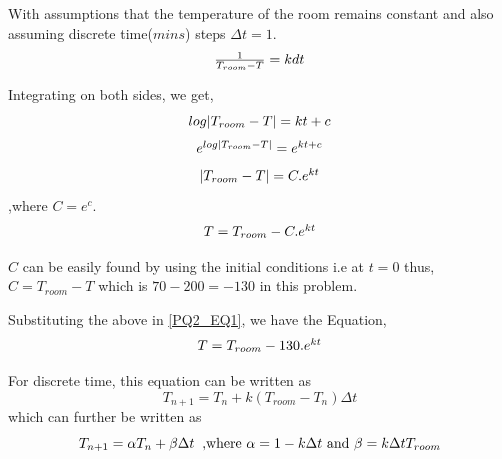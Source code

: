 \documentclass[fleqn,letterpaper,12pt]{report}
\begin{document}
With assumptions that the temperature of the room remains constant and also assuming discrete time($mins$) steps $\Delta t = 1$. 
\begin{equation}
$$\frac{1}{T_{room}-T} = kdt$$
\end{equation}

Integrating on both sides, we get,
\begin{equation}
$$log|T_{room}-T| = kt+c$$
\end{equation}
\begin{equation}
$$e^{log|T_{room}-T|} = e^{kt+c}$$
\end{equation}
\begin{equation}
$$|T_{room}-T| = C.e^{kt}$$
\end{equation}
,where $C = e^c$.
\begin{equation}
$$T = T_{room} - C.e^{kt}$$
\label{PQ2_EQ1}
\end{equation}

$C$ can be easily found by using the initial conditions i.e at $t=0$
thus,
$C = T_{room}-T$
which is $70-200 = -130$ in this problem.

Substituting the above in \eqref{PQ2_EQ1}, we have the Equation,
\begin{equation}
$$T = T_{room} - 130.e^{kt}$$
\end{equation}

For discrete time, this equation can be written as 
\begin{equation}
T_{n+1} = T_{n} + k(T_{room} - T_n)\Delta t
\end{equation}
which can further be written as 
\begin{equation}
$$T_{n+1} = \alpha T_{n} + \beta\Delta t\;\;$$
\label{EQ2}
\mbox{,where $\alpha = 1 - k\Delta t$ and $\beta = k\Delta tT_{room}$}
\end{equation}
\end{document}
